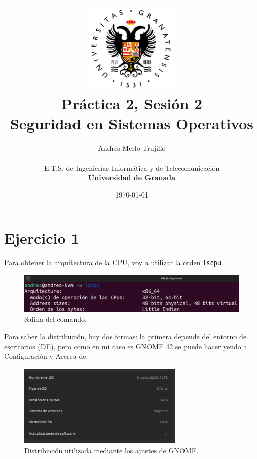 \documentclass{article}
\title{
\includegraphics[width=1.75in]{imagenes/UGR-Logo.png} \\
\vspace*{1in}
\textbf{Práctica 2, Sesión 2} \\
Seguridad en Sistemas Operativos \\
\vspace*{0.5in}}
\author{Andrés Merlo Trujillo \\
\vspace*{0.5in} \\
E.T.S. de Ingenierías Informática y de Telecomunicación \\
\textbf{Universidad de Granada}} \date{\today}
\begin{document}
\begin{titlingpage}
    \maketitle
\end{titlingpage}

\tableofcontents

\newpage

\pagestyle{fancy}


{}
\section*{Ejercicio 1}

Para obtener la arquitectura de la CPU, voy a utilizar la orden \verb|lscpu|.

\begin{figure}[H]
    \includegraphics[width=\textwidth]{imagenes/Captura desde 2022-11-23 10-33-11.png}
    \caption{Salida del comando.}
\end{figure}

\bigskip

Para saber la distribución, hay dos formas: la primera depende del entorno de escritorios (DE), pero como en mi caso es GNOME 42 se puede hacer yendo a Configuración y Acerca de:

\begin{figure}[H]
    \centering
    \includegraphics[width=0.7\textwidth]{imagenes/Captura desde 2022-11-23 10-37-46.png}
    \caption{Distribución utilizada mediante los ajustes de GNOME.}
\end{figure}
\end{document}
